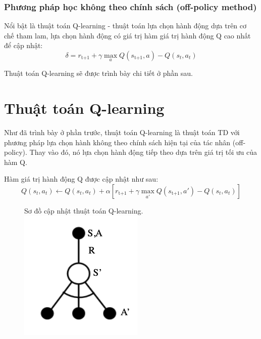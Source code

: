 \documentclass{uetgraduation}
\begin{document}
\subsubsection{Phương pháp học không theo chính sách (off-policy method)}
Nổi bật là thuật toán Q-learning - thuật toán lựa chọn hành động dựa trên cơ chế tham lam, lựa chọn hành động có giá trị
hàm giá trị hành động Q cao nhất để cập nhật:
\begin{equation}
    \delta = r_\text{t+1} + \gamma \max_{a} Q (s_\text{t+1}, a) - Q (s_t, a_t)
\end{equation}

Thuật toán Q-learning sẽ được trình bày chi tiết ở phần sau.

\section{Thuật toán Q-learning}
Như đã trình bày ở phần trước, thuật toán Q-learning là thuật toán TD với phương pháp lựa chọn hành không theo chính sách hiện tại của tác nhân (off-policy). Thay vào đó,
nó lựa chọn hành động tiếp theo dựa trên giá trị tối ưu của hàm Q.

Hàm giá trị hành động Q được cập nhật như sau:
\begin{equation}
    Q (s_t, a_t) \leftarrow Q (s_t, a_t) + \alpha [r_\text{t+1} + \gamma \max_{a'} Q (s_\text{t+1}, a') - Q (s_t, a_t) ]
\end{equation}

\begin{figure}{Sơ đồ cập nhật thuật toán Q-learning.}
    \centering
    \includegraphics[scale=0.5]{q_learning_diagram}
    \label{fig:q_learning}
\end{figure}
\end{document}
